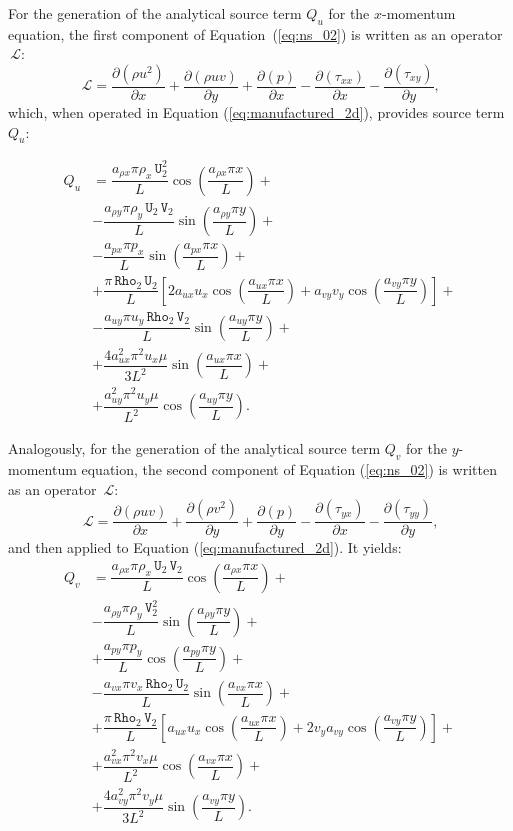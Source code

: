 \documentclass[10pt]{article}
\newcommand{\Diff}[2] {\dfrac{\partial( #1)}{\partial #2}}
\newcommand{\Rho}{\,\mathtt{Rho}}
\newcommand{\U}{\,\mathtt{U}}
\newcommand{\V}{\,\mathtt{V}}
\newcommand{\Lo}{\,\mathcal{L}}
\begin{document}
For the generation of the analytical source term $Q_u$ for the $x$-momentum equation, the first component of Equation~(\ref{eq:ns_02}) is written as an  operator $\Lo$:
\begin{equation*}
 \Lo= \Diff{\rho u^2 }{x}+\Diff{\rho uv}{y} +\Diff{p}{x}-\Diff{\tau_{xx}}{x}-\Diff{\tau_{xy}}{y},
\end{equation*}
which, when operated in Equation (\ref{eq:manufactured_2d}), provides source term $Q_{u}$:

\begin{equation}
 \begin{split}
Q_u &=  \dfrac{a_{\rho x} \pi \rho_x \U_2^2}{L}\cos\left(\dfrac{a_{\rho x} \pi x}{L}\right)+\\
&- \dfrac{a_{\rho y} \pi \rho_y \U_2 \V_2}{L}\sin\left(\dfrac{a_{\rho y} \pi y}{L}\right)+\\
&-\dfrac{a_{px} \pi p_x }{L}\sin\left(\dfrac{a_{px} \pi x}{L}\right)+\\
&+\dfrac{\pi \Rho_2 \U_2}{L}\left[2 a_{ux} u_x \cos\left(\dfrac{a_{ux} \pi x}{L}\right)+a_{vy} v_y \cos\left(\dfrac{a_{vy} \pi y}{L}\right)\right]+\\
&-\dfrac{a_{uy} \pi u_y \Rho_2 \V_2 }{L}\sin\left(\dfrac{a_{uy} \pi y}{L}\right)+\\
&+\dfrac{4a_{ux}^2 \pi^2 u_x \mu}{3L^2}\sin\left(\dfrac{a_{ux} \pi x}{L}\right) +\\
&+\dfrac{a_{uy}^2 \pi^2 u_y \mu}{L^2}\cos\left(\dfrac{a_{uy} \pi y}{L}\right).
 \end{split}
\end{equation}


Analogously, for the generation of the analytical source term $Q_v$ for the $y$-momentum equation, the second component of Equation  (\ref{eq:ns_02})  is written as an  operator $\Lo$:
\begin{equation*}
   \Lo =\Diff{\rho uv}{x}+\Diff{\rho v^2}{y} +\Diff{p}{y}-\Diff{\tau_{yx}}{x}-\Diff{\tau_{yy}}{y},
\end{equation*}
and then applied to Equation  (\ref{eq:manufactured_2d}). It yields:
\begin{equation}
 \begin{split}
Q_v &=\dfrac{ a_{\rho x} \pi \rho_x \U_2 \V_2 }{L}\cos\left(\dfrac{a_{\rho x} \pi x}{L}\right)+\\
&-\dfrac{a_{\rho y} \pi \rho_y \V_2^2 }{L}\sin\left(\dfrac{a_{\rho y} \pi y}{L}\right)+\\
&+\dfrac{a_{py} \pi p_y}{L}\cos\left(\dfrac{a_{py} \pi y}{L}\right) +\\
&-\dfrac{ a_{vx} \pi v_x \Rho_2 \U_2}{L}\sin\left(\dfrac{a_{vx} \pi x}{L}\right)+\\
&+\dfrac{\pi \Rho_2 \V_2}{L}\left[a_{ux} u_x \cos\left(\dfrac{a_{ux} \pi x}{L}\right)+2 v_y a_{vy} \cos\left(\dfrac{a_{vy} \pi y}{L}\right)\right]+\\
&+\dfrac{a_{vx}^2 \pi^2 v_x \mu }{L^2}\cos\left(\dfrac{a_{vx} \pi x}{L}\right) +\\
&+\dfrac{4a_{vy}^2 \pi^2 v_y \mu }{3L^2}\sin\left(\dfrac{a_{vy} \pi y}{L}\right)
.
 \end{split}
\end{equation}
\end{document}
